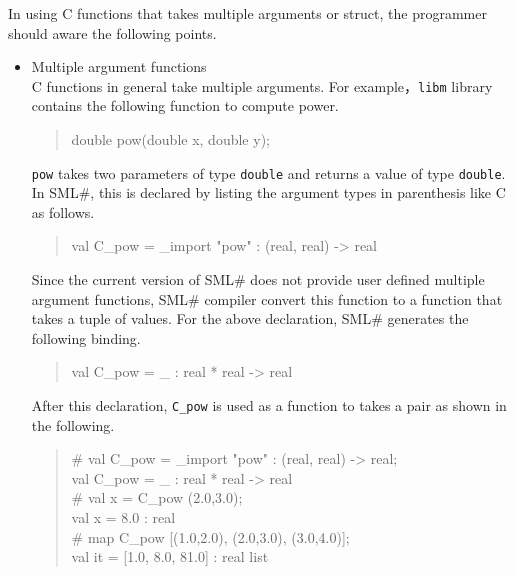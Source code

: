 \documentclass{jbook}
\newcommand{\smlsharp}{SML\#}
\newenvironment{program}{\begin{tt}\begin{quote}}{\end{quote}\end{tt}}
\begin{document}
\else%
	In using C functions that takes multiple arguments or struct,
the programmer should aware the following points.
\begin{itemize}
\item Multiple argument functions\\
	C functions in general take multiple arguments.
	For example，{\tt libm} library contains the following function
to compute power.
\begin{program}
double pow(double x, double y);
\end{program}
	{\tt pow} takes two parameters of type {\tt double} and returns
a value of type {\tt double}.
	In \smlsharp{}, this is declared by listing the argument types
in parenthesis like C as follows.
\begin{program}
val C\_pow = \_import "pow" : (real, real) -> real
\end{program}
	Since the current version of \smlsharp{} does not provide
user defined multiple argument functions, \smlsharp{} compiler convert
this function to a function that takes a tuple of values.
	For the above declaration, \smlsharp{} generates the following binding.
\begin{program}
val C\_pow = \_ : real * real -> real\\
\end{program}
	After this declaration, {\tt C\_pow} is used as a function to
takes a pair as shown in the following.
\begin{program}
\# val C\_pow = \_import "pow" : (real, real) -> real;\\
val C\_pow = \_ : real * real -> real\\
\# val x = C\_pow (2.0,3.0);\\
val x = 8.0 : real\\
\# map C\_pow [(1.0,2.0), (2.0,3.0), (3.0,4.0)];\\
val it = [1.0, 8.0, 81.0] : real list
\end{program}


\end{itemize}
\end{document}
